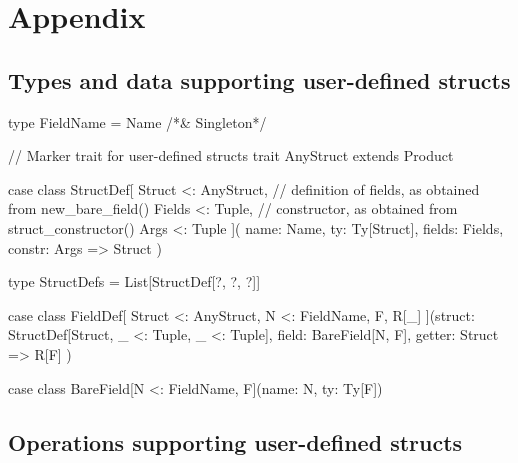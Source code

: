 \documentclass[11pt]{article}
\begin{document}




\clearpage
\appendix

\section{Appendix}
\label{sec:appendix}

\subsection*{Types and data supporting user-defined structs}

\begin{ScalaBlockSimple}
type FieldName = Name /*& Singleton*/

// Marker trait for user-defined structs
trait AnyStruct extends Product

case class StructDef[
  Struct <: AnyStruct,
  // definition of fields, as obtained from new_bare_field()
  Fields <: Tuple,
  // constructor, as obtained from struct_constructor()
  Args   <: Tuple
](
  name: Name,
  ty: Ty[Struct],
  fields: Fields,
  constr: Args => Struct
)

type StructDefs = List[StructDef[?, ?, ?]]

case class FieldDef[
  Struct <: AnyStruct,
  N <: FieldName,
  F,
  R[_]
](struct: StructDef[Struct, _ <: Tuple, _ <: Tuple],
  field: BareField[N, F],
  getter: Struct => R[F]
)

case class BareField[N <: FieldName, F](name: N, ty: Ty[F])
\end{ScalaBlockSimple}

\subsection*{Operations supporting user-defined structs}
\end{document}

